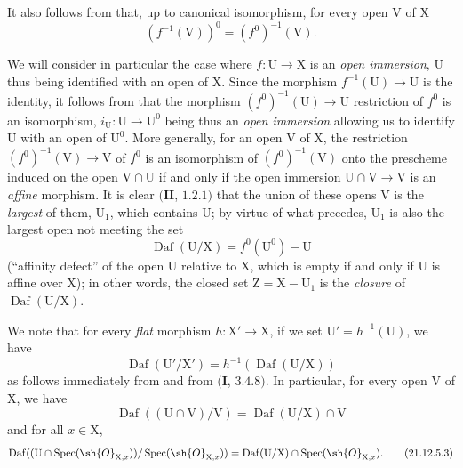 It also follows from  that, up to canonical isomorphism, for every open $\mathrm{V}$ of $\mathrm{X}$
\[
\label{IV.21.12.4}
  (f^{-1}(\mathrm{V}))^0=(f^0)^{-1}(\mathrm{V}).
  \tag{21.12.4}
\]

\begin{env}[21.12.5]
\label{IV.21.12.5}
We will consider in particular the case where $f:\mathrm{U}\to\mathrm{X}$ is an \emph{open immersion}, $\mathrm{U}$ thus being identified with an open of $\mathrm{X}$.
Since the morphism $f^{-1}(\mathrm{U})\to\mathrm{U}$ is the identity, it follows from  that the morphism $(f^0)^{-1}(\mathrm{U})\to\mathrm{U}$ restriction of $f^0$ is an isomorphism, $i_{\mathrm{U}}:\mathrm{U}\to\mathrm{U}^0$ being thus an \emph{open immersion} allowing us to identify $\mathrm{U}$ with an open of $\mathrm{U}^0$.
More generally, for an open $\mathrm{V}$ of $\mathrm{X}$, the restriction $(f^0)^{-1}(\mathrm{V})\to\mathrm{V}$ of $f^0$ is an isomorphism of $(f^0)^{-1}(\mathrm{V})$ onto the prescheme induced on the open $\mathrm{V}\cap\mathrm{U}$ if and only if the open immersion $\mathrm{U}\cap\mathrm{V}\to\mathrm{V}$ is an \emph{affine} morphism.
It is clear $(\mathbf{II}$, $1.2.1)$
that the union of these opens $\mathrm{V}$ is the \emph{largest} of them, $\mathrm{U}_1$, which contains $\mathrm{U}$; by virtue of what precedes, $\mathrm{U}_1$ is also the largest open not meeting the set
\[
  \operatorname{Daf}(\mathrm{U}/\mathrm{X})=f^0(\mathrm{U}^0)-\mathrm{U}
\]
(``affinity defect'' of the open $\mathrm{U}$ relative to $\mathrm{X}$, which is empty if and only if $\mathrm{U}$ is affine over $\mathrm{X}$); in other words, the closed set $\mathrm{Z}=\mathrm{X}-\mathrm{U}_1$ is the \emph{closure} of $\operatorname{Daf}(\mathrm{U}/\mathrm{X})$.

We note that for every \emph{flat} morphism $h:\mathrm{X}'\to\mathrm{X}$, if we set $\mathrm{U}'=h^{-1}(\mathrm{U})$, we have
\[
\label{IV.21.12.5.1}
  \operatorname{Daf}(\mathrm{U}'/\mathrm{X}')=h^{-1}(\operatorname{Daf}(\mathrm{U}/\mathrm{X}))
  \tag{21.12.5.1}
\]
as follows immediately from  and from $(\mathbf{I}$, $3.4.8)$.
In particular, for every open $\mathrm{V}$ of $\mathrm{X}$, we have
\[
\label{IV.21.12.5.2}
  \operatorname{Daf}((\mathrm{U}\cap\mathrm{V})/\mathrm{V})=\operatorname{Daf}(\mathrm{U}/\mathrm{X})\cap\mathrm{V}
  \tag{21.12.5.2}
\]
and for all $x\in\mathrm{X}$,
\[
\label{IV.21.12.5.3}
  \operatorname{Daf}((\mathrm{U}\cap\operatorname{Spec}(\sh{O}_{\mathrm{X},x}))/\operatorname{Spec}(\sh{O}_{\mathrm{X},x}))=\operatorname{Daf}(\mathrm{U}/\mathrm{X})\cap\operatorname{Spec}(\sh{O}_{\mathrm{X},x}).
  \tag{21.12.5.3}
\]
\end{env}


